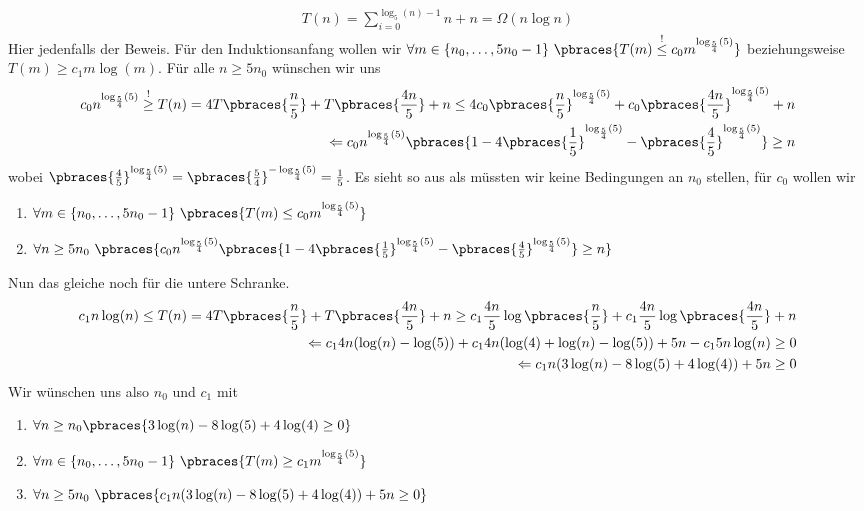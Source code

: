 \begin{solution}
  \begin{align*}
    T(n) = \sum_{i=0}^{\log_5(n)-1} n + n = \Omega(n \log n)
  \end{align*}
  Hier jedenfalls der Beweis.
	Für den Induktionsanfang wollen wir $\forall m \in \{n_0, \dots, 5n_0 - 1\} \ \pbraces{T(m) \stackrel{!}{\leq} c_0 m^{\log_\frac{5}{4}(5)}}$ beziehungsweise $T(m) \geq c_1 m \log(m)$.
	Für alle $n \geq 5n_0$ wünschen wir uns
	\begin{align*}
	c_0 n^{\log_\frac{5}{4}(5)} \stackrel{!}{\geq} T(n) = 4 T\pbraces{\frac{n}{5}} + T\pbraces{\frac{4n}{5}} + n \leq 4 c_0 \pbraces{\frac{n}{5}}^{\log_\frac{5}{4}(5)} + c_0 \pbraces{\frac{4n}{5}}^{\log_\frac{5}{4}(5)} + n \\
	\Leftarrow c_0 n^{\log_{\frac{5}{4}}(5)} \pbraces{1 - 4  \pbraces{\frac{1}{5}}^{\log_\frac{5}{4}(5)} - \pbraces{\frac{4}{5}}^{\log_\frac{5}{4}(5)}} \geq n
	\end{align*}
	wobei $\pbraces{\frac{4}{5}}^{\log_\frac{5}{4}(5)} = \pbraces{\frac{5}{4}}^{-\log_\frac{5}{4}(5)} = \frac{1}{5}$.
	Es sieht so aus als müssten wir keine Bedingungen an $n_0$ stellen, für $c_0$ wollen wir
	\begin{enumerate}
		\item $\forall m \in \{n_0, \dots, 5n_0 - 1\} \ \pbraces{T(m) \leq c_0 m^{\log_\frac{5}{4}(5)}}$
		\item $\forall n \geq 5n_0 \ \pbraces{c_0 n^{\log_{\frac{5}{4}}(5)} \pbraces{1 - 4  \pbraces{\frac{1}{5}}^{\log_\frac{5}{4}(5)} - \pbraces{\frac{4}{5}}^{\log_\frac{5}{4}(5)}} \geq n}$
	\end{enumerate}
	Nun das gleiche noch für die untere Schranke.
	\begin{align*}
	c_1 n\log(n) \leq T(n) = 4 T\pbraces{\frac{n}{5}} + T\pbraces{ \frac{4n}{5}} + n \geq c_1 \frac{4n}{5} \log\pbraces{\frac{n}{5}} + c_1 \frac{4n}{5} \log\pbraces{\frac{4n}{5}} + n \\
	\Leftarrow c_1 4n (\log(n) - \log(5)) + c_1 4n (\log(4) + \log(n) - \log(5)) + 5n - c_1 5n \log(n) \geq 0 \\
	\Leftarrow c_1 n(3 \log(n) - 8 \log(5) + 4 \log(4)) + 5n \geq 0
	\end{align*}
	Wir wünschen uns also $n_0$ und $c_1$ mit
		\begin{enumerate}
		\item $\forall n \geq n_0 \pbraces{3 \log(n) - 8 \log(5) + 4 \log(4) \geq 0}$
		\item $\forall m \in \{n_0, \dots, 5n_0 - 1\} \ \pbraces{T(m) \geq c_1 m^{\log_\frac{5}{4}(5)}}$
		\item $\forall n \geq 5n_0 \ \pbraces{c_1 n(3 \log(n) - 8 \log(5) + 4 \log(4)) + 5n \geq 0}$
	\end{enumerate}
\end{solution}
